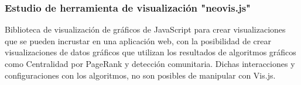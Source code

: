 \subsubsection{Estudio de herramienta de visualización "neovis.js"} Biblioteca de visualización de gráficos de JavaScript para crear visualizaciones que se pueden incrustar en una aplicación web, con la posibilidad de crear visualizaciones de datos gráficos que utilizan los resultados de algoritmos gráficos como Centralidad por PageRank y detección comunitaria. Dichas interacciones y configuraciones con los algoritmos, no son posibles de manipular con Vis.js. 